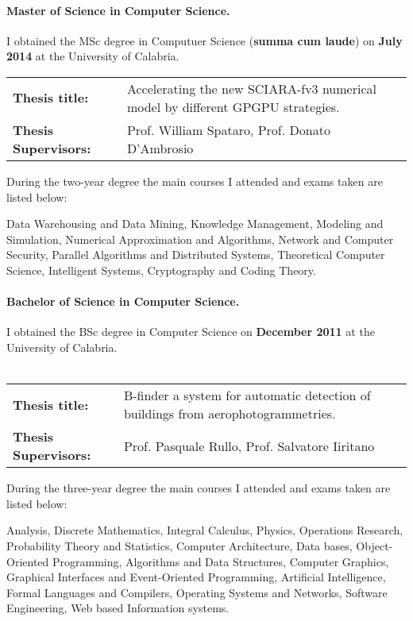\documentclass[a4paper,10pt]{article}
\begin{document}
\paragraph{Master of Science in Computer Science.} 

I obtained the MSc degree in Computuer Science (\textbf{summa cum laude}) on
\textbf{July 2014} at the University of Calabria.\\
{\centering
\begin{tabular}{l l}
\textbf{Thesis title:}& \textsf{Accelerating the new SCIARA-fv3 numerical model
by different GPGPU strategies.}\\
\textbf{Thesis Supervisors:} & Prof. William Spataro, Prof. Donato D'Ambrosio\\
\end{tabular}
}

\noindent During the two-year degree the main courses I attended and exams taken are listed below: 

\noindent Data Warehousing and Data Mining, Knowledge Management, Modeling and Simulation, Numerical Approximation and Algorithms, 
Network and Computer Security, Parallel Algorithms and Distributed Systems, Theoretical Computer Science, Intelligent Systems, 
Cryptography and Coding Theory.


\paragraph{Bachelor of Science in Computer Science.} 

I obtained the BSc degree in Computer Science on \textbf{December 2011} at the
University of Calabria.\\ \hfill\\

{\centering
\begin{tabular}{l l}
\textbf{Thesis title:}& \textsf{B-finder a system for automatic detection of
buildings from aerophotogrammetries.} \\
\textbf{Thesis Supervisors:} & Prof. Pasquale Rullo, Prof. Salvatore Iiritano\\
\end{tabular}
}
\noindent During the three-year degree the main courses I attended and exams taken are listed below:

\noindent Analysis, Discrete Mathematics, Integral Calculus, Physics,
 Operations Research, Probability Theory and Statistics, Computer Architecture,
 Data bases, Object-Oriented Programming, Algorithms and Data Structures,
 Computer Graphics, Graphical Interfaces and Event-Oriented Programming,
 Artificial Intelligence, Formal Languages and Compilers, Operating Systems and
 Networks, Software Engineering, Web based Information systems.
\end{document}

